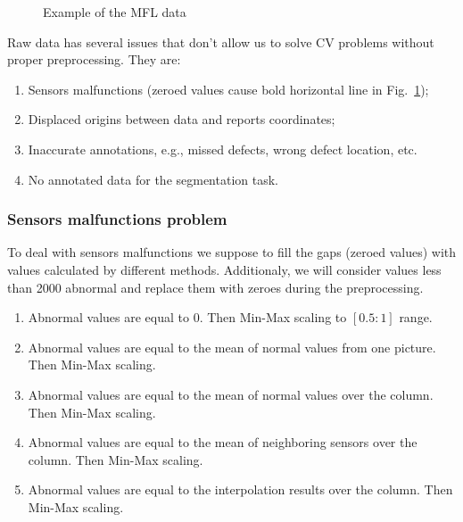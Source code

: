 \begin{figure}[ht]
	\caption{Example of the MFL data}
	\label{ris:defect_example}
\end{figure}

Raw data has several issues that don't allow us to solve CV problems without proper preprocessing.
They are:
\begin{enumerate}
	\item Sensors malfunctions (zeroed values cause bold horizontal line in Fig.~\ref{ris:defect_example});
	\item Displaced origins between data and reports coordinates;
	\item Inaccurate annotations, e.g., missed defects, wrong defect location, etc.
	\item No annotated data for the segmentation task.
\end{enumerate}

\subsubsection{Sensors malfunctions problem}
To deal with sensors malfunctions we suppose to fill the gaps (zeroed values) with values calculated by different methods.
Additionaly, we will consider values less than 2000 abnormal and replace them with zeroes during the preprocessing.
\begin{enumerate}
	\item Abnormal values are equal to 0. Then Min-Max scaling to $[0.5:1]$ range.
	\item Abnormal values are equal to the mean of normal values from one picture. Then Min-Max scaling.
	\item Abnormal values are equal to the mean of normal values over the column. Then Min-Max scaling.
	\item Abnormal values are equal to the mean of neighboring sensors over the column. Then Min-Max scaling.
	\item Abnormal values are equal to the interpolation results over the column. Then Min-Max scaling.
\end{enumerate}


